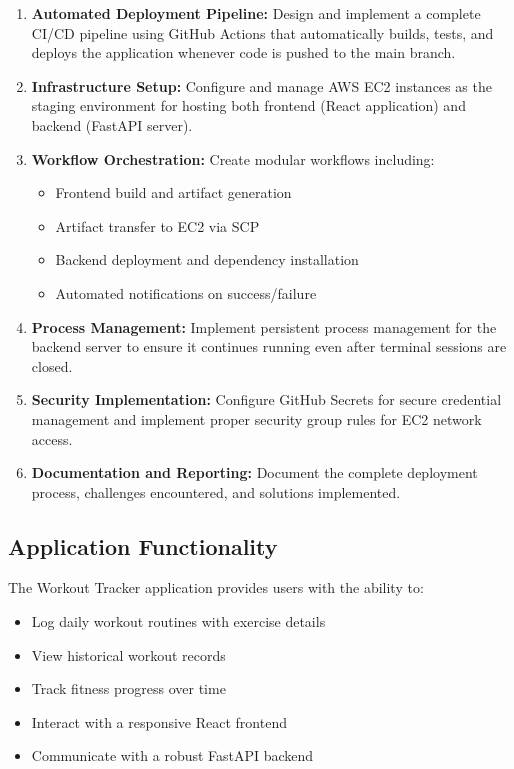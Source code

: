 \documentclass{article}
\begin{document}
\begin{enumerate}
    \item \textbf{Automated Deployment Pipeline:} Design and implement a complete CI/CD pipeline using GitHub Actions that automatically builds, tests, and deploys the application whenever code is pushed to the main branch.
    
    \item \textbf{Infrastructure Setup:} Configure and manage AWS EC2 instances as the staging environment for hosting both frontend (React application) and backend (FastAPI server).
    
    \item \textbf{Workflow Orchestration:} Create modular workflows including:
    \begin{itemize}
        \item Frontend build and artifact generation
        \item Artifact transfer to EC2 via SCP
        \item Backend deployment and dependency installation
        \item Automated notifications on success/failure
    \end{itemize}
    
    \item \textbf{Process Management:} Implement persistent process management for the backend server to ensure it continues running even after terminal sessions are closed.
    
    \item \textbf{Security Implementation:} Configure GitHub Secrets for secure credential management and implement proper security group rules for EC2 network access.
    
    \item \textbf{Documentation and Reporting:} Document the complete deployment process, challenges encountered, and solutions implemented.
\end{enumerate}

\subsection{Application Functionality}

The Workout Tracker application provides users with the ability to:
\begin{itemize}
    \item Log daily workout routines with exercise details
    \item View historical workout records
    \item Track fitness progress over time
    \item Interact with a responsive React frontend
    \item Communicate with a robust FastAPI backend
\end{itemize}
\end{document}
